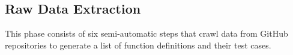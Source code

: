 
\subsection{Raw Data Extraction}

This phase consists of six semi-automatic steps that crawl data from GitHub repositories to generate a list of function definitions and their test cases.

